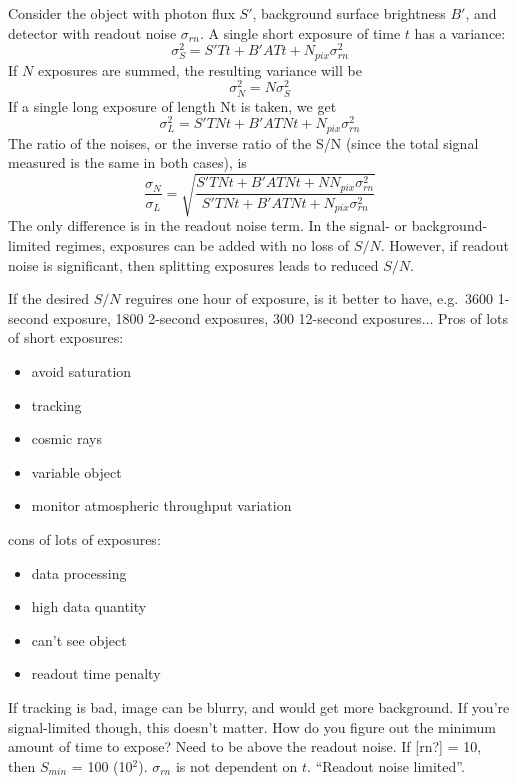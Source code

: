 \documentclass[12pt]{article}
\begin{document}
Consider the object with photon flux $S'$,
background surface brightness $B'$, and detector
with readout noise $\sigma_{rn}$. A single short exposure of
time $t$ has a variance:
    $$ \sigma_S^2 = S'Tt + B'ATt + N_{pix}\sigma_{rn}^2 $$
If $N$ exposures are summed, the resulting variance will be
    $$ \sigma_N^2 = N\sigma_S^2 $$
If a single long exposure of length Nt is taken, we get
    $$ \sigma_L^2 = S'TNt + B'ATNt + N_{pix}\sigma_{rn}^2 $$
The ratio of the noises, or the inverse ratio of the S/N (since the
total signal measured is the same in both cases), is
    $$ \frac{\sigma_N}{\sigma_L} = \sqrt{\frac
    {S'TNt + B'ATNt + NN_{pix}\sigma_{rn}^2 }
    {S'TNt + B'ATNt + N_{pix}\sigma_{rn}^2}
    }$$
The only difference is in the readout noise term.
In the signal- or background-limited regimes, exposures can be added
with no loss of $S/N$. However, if readout noise is significant, then
splitting exposures leads to reduced $S/N$.

\textcolor{myBlue}{If the desired $S/N$ reguires one hour of exposure,
    is it better to have, e.g.\ 3600 1-second exposure, 1800 2-second
    exposures, 300 12-second exposures$\ldots$
    Pros of lots of short exposures:
    \begin{itemize}
        \item avoid saturation
        \item tracking
        \item cosmic rays
        \item variable object
        \item monitor atmospheric throughput variation
    \end{itemize}
    cons of lots of exposures:
    \begin{itemize}
        \item data processing
        \item high data quantity
        \item can't see object
        \item readout time penalty
    \end{itemize}
    If tracking is bad, image can be blurry, and would get more background.
    If you're signal-limited though, this doesn't matter.
    How do you figure out the minimum amount of time to expose?
    Need to be above the readout noise. If [rn?] = 10, then
    $S_{min}$ = 100 (10$^2$). $\sigma_{rn}$ is not dependent on $t$.
    ``Readout noise limited''.
}

\textcolor{om}{\emph{}}
\end{document}
